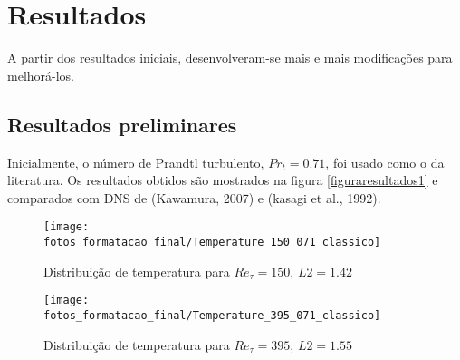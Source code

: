\chapter{Resultados}

A partir dos resultados iniciais, desenvolveram-se mais e mais modificações para melhorá-los.

\section{Resultados preliminares}
Inicialmente, o número de Prandtl turbulento, $Pr_t = 0.71$, foi usado como o da literatura. Os resultados obtidos são mostrados na figura \ref{figuraresultados1} e comparados com DNS de (Kawamura, 2007) e (kasagi et al., 1992).\\
\begin{figure*}[h!] 
	\centering
	\begin{subfigure}[t]{0.49\textwidth}
		\centering
		\texttt{[image: fotos\_formatacao\_final/Temperature\_150\_071\_classico]}
		\caption{Distribuição de temperatura para $Re_\tau = 150$, $L2 = 1.42$}
	\end{subfigure}
	\begin{subfigure}[t]{0.49\textwidth}
		\centering
		\texttt{[image: fotos\_formatacao\_final/Temperature\_395\_071\_classico]}
		\caption{Distribuição de temperatura para $Re_\tau = 395$, $L2 = 1.55$}
	\end{subfigure}

\end{figure*}
